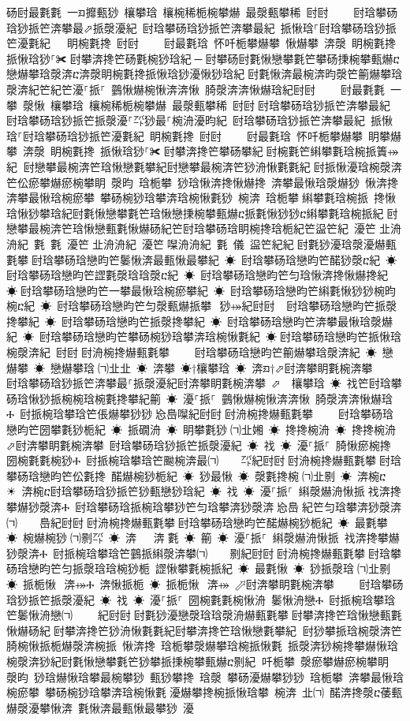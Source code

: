 ﻿\documentclass[output=paper]{langsci/langscibook}
\begin{document}
\begin{exe}
{\begin{exe}
砀尀最氀氀 一ᤀ攠甀猀 欀攀琀 欀椀稀栀椀攀爀 最漀甀攀稀 尀尀਀    尀琀攀砀琀猀挀笀渀攀最⬀挀漀瀀紀 尀琀攀砀琀猀挀笀渀攀最紀 挀愀琀⸀尀琀攀砀琀猀挀笀瀀氀紀   眀椀氀搀 尀尀਀    尀最氀琀 怀吀栀攀爀攀 愀爀攀 渀漀 眀椀氀搀 挀愀琀猀⸀✀਀尀攀渀搀笀砀氀椀猀琀紀਀─਀尀攀砀尀氀愀戀攀氀笀攀砀㨀椀攀甀爀ⴀ戀爀攀琀漀渀ⴀ渀漀眀椀氀搀挀愀琀猀瀀愀猀琀紀਀尀氀愀渀最椀渀昀漀笀䈀爀攀琀漀渀紀笀紀笀瀀⸀挀⸀ 䴀愀爀椀愀渀渀愀 䐀漀渀渀愀爀琀紀尀尀਀    尀最氀氀 一攀 漀愀 欀攀琀 欀椀稀栀椀攀爀 最漀甀攀稀 尀尀਀尀琀攀砀琀猀挀笀渀攀最紀 尀琀攀砀琀猀挀笀挀漀瀀⸀㌀猀最⸀椀洀瀀昀紀 尀琀攀砀琀猀挀笀渀攀最紀 挀愀琀⸀尀琀攀砀琀猀挀笀瀀氀紀 眀椀氀搀 尀尀਀    尀最氀琀 怀吀栀攀爀攀 眀攀爀攀 渀漀 眀椀氀搀 挀愀琀猀⸀✀਀尀攀渀搀笀攀砀攀紀਀尀椀氀笀䌀攀氀琀椀挀簀⤀紀਀਀尀戀攀最椀渀笀琀愀戀氀攀紀尀戀攀最椀渀笀猀洀愀氀氀紀਀尀挀愀瀀琀椀漀渀笀伀瘀攀爀瘀椀攀眀 漀昀 琀栀攀 猀琀愀渀搀愀爀搀 渀攀最愀琀漀爀猀 愀渀搀 渀攀最愀琀椀瘀攀 攀砀椀猀琀攀渀琀椀愀氀猀 椀渀 琀栀攀਀䌀攀氀琀椀挀 搀愀琀愀猀攀琀紀尀氀愀戀攀氀笀琀愀戀㨀椀攀甀爀ⴀ挀氀愀猀猀ⴀ䌀攀氀琀椀挀紀਀尀戀攀最椀渀笀琀愀戀甀氀愀爀砀紀笀尀琀攀砀琀眀椀搀琀栀紀笀䀀笀紀 瀀笀㄀㐀洀洀紀 氀 氀 瀀笀㄀㐀洀洀紀 瀀笀㄀㘀洀洀紀 氀 儀 䀀笀紀紀਀尀氀猀瀀琀漀瀀爀甀氀攀਀尀琀攀砀琀戀昀笀䰀愀渀最甀愀最攀紀 ☀ 尀琀攀砀琀戀昀笀䤀猀漀ⴀ紀 ☀ 尀琀攀砀琀戀昀笀䜀氀漀琀琀漀ⴀ紀 ☀ 尀琀攀砀琀戀昀笀匀琀愀渀搀愀爀搀紀 ☀਀尀琀攀砀琀戀昀笀一攀最愀琀椀瘀攀紀 ☀ 尀琀攀砀琀戀昀笀䌀氀愀猀猀椀昀椀ⴀ紀 ☀ 尀琀攀砀琀戀昀笀匀漀甀爀挀攀⠀猀⤀紀尀尀਀☀ 尀琀攀砀琀戀昀笀挀漀搀攀紀 ☀ 尀琀攀砀琀戀昀笀挀漀搀攀紀 ☀ 尀琀攀砀琀戀昀笀渀攀最愀琀漀爀紀 ☀ 尀琀攀砀琀戀昀笀攀砀椀猀琀攀渀琀椀愀氀紀 ☀਀尀琀攀砀琀戀昀笀挀愀琀椀漀渀紀 尀尀਀尀洀椀搀爀甀氀攀਀    尀琀攀砀琀戀昀笀䈀爀攀琀漀渀紀 ☀ 戀爀攀 ☀ 戀爀攀琀㄀㈀㐀㐀 ☀ 渀攀 ☀†欀攀琀 ☀ 渀ᤀ†⬀尀渀攀眀氀椀渀攀਀    尀琀攀砀琀猀挀笀渀攀最⸀挀漀瀀紀尀渀攀眀氀椀渀攀 ⬀  欀攀琀 ☀ 䄀笀尀琀攀砀琀愀猀挀椀椀琀椀氀搀攀紀䈀 ☀ 瀀⸀挀⸀ 䴀愀爀椀愀渀渀愀 䐀漀渀渀愀爀琀Ⰰ 尀挀椀琀攀琀笀倀爀攀猀猀㄀㤀㠀㘀紀尀尀਀尀洀椀搀爀甀氀攀਀    尀琀攀砀琀戀昀笀圀攀氀猀栀紀 ☀ 挀礀洀 ☀ 眀攀氀猀㄀㈀㐀㜀 ☀ 搀搀椀洀 ☀ 搀搀椀洀 ⬀尀渀攀眀氀椀渀攀 尀琀攀砀琀猀挀笀挀漀瀀紀 ☀ 䄀 ☀ 瀀⸀挀⸀ 䐀愀瘀椀搀 圀椀氀氀椀猀Ⰰ 尀挀椀琀攀琀笀䬀椀渀最㈀　　㌀紀尀尀਀尀洀椀搀爀甀氀攀਀尀琀攀砀琀戀昀笀伀氀搀 䤀爀椀猀栀紀 ☀ 猀最愀 ☀ 漀氀搀椀㄀㈀㐀㔀 ☀ 渀椀ⴀ ☀ 渀椀ⴀ尀琀攀砀琀猀挀笀猀甀戀猀琀紀 ☀ 䄀 ☀ 瀀⸀挀⸀ 䌀漀爀洀愀挀਀䄀渀搀攀爀猀漀渀Ⰰ 尀琀攀砀琀挀椀琀攀猀笀匀琀攀渀猀漀渀㄀㤀㠀㄀紀笀匀琀攀渀猀漀渀㈀　　㠀紀尀尀਀尀洀椀搀爀甀氀攀਀尀琀攀砀琀戀昀笀䤀爀椀猀栀紀 ☀ 最氀攀 ☀ 椀爀椀猀㄀㈀㔀㌀ ☀ 渀 ☀ 渀氀 ☀ 䈀 ☀ 瀀⸀挀⸀ 䌀漀爀洀愀挀 䄀渀搀攀爀猀漀渀Ⰰ 尀挀椀琀攀琀笀䴀挀䌀漀渀攀㈀　　㔀紀尀尀਀尀洀椀搀爀甀氀攀਀尀琀攀砀琀戀昀笀匀挀漀琀琀椀猀栀 䜀愀攀氀椀挀紀 ☀ 最氀愀 ☀ 猀挀漀琀㄀㈀㐀㔀 ☀ 挀栀愀⠀渀⤀Ⰰ 渀愀挀栀 ☀ 挀栀愀⠀渀⤀ ⬀尀渀攀眀氀椀渀攀਀    尀琀攀砀琀猀挀笀挀漀瀀紀 ☀ 䄀 ☀ 瀀⸀挀⸀ 圀椀氀氀椀愀洀 䰀愀洀戀Ⰰ 尀挀椀琀攀琀笀䰀愀洀戀㈀　　㄀紀尀尀਀尀氀猀瀀戀漀琀琀漀洀爀甀氀攀਀尀攀渀搀笀琀愀戀甀氀愀爀砀紀਀尀攀渀搀笀猀洀愀氀氀紀尀攀渀搀笀琀愀戀氀攀紀਀਀尀猀攀挀琀椀漀渀笀䐀椀愀挀栀爀漀渀椀挀 愀渀搀 琀栀攀漀爀攀琀椀挀愀氀 挀漀渀猀椀搀攀爀愀琀椀漀渀猀紀尀氀愀戀攀氀笀猀攀挀㨀椀攀甀爀ⴀ㔀紀਀਀吀栀攀 漀瘀攀爀瘀椀攀眀 漀昀 猀琀爀愀琀攀最椀攀猀 甀猀攀搀 琀漀 攀砀瀀爀攀猀猀 琀栀攀 渀攀最愀琀椀瘀攀 攀砀椀猀琀攀渀琀椀愀氀਀瀀爀攀搀椀挀愀琀攀 椀渀 㐀㈀ 䤀渀搀漀ⴀ䔀甀爀漀瀀攀愀渀 氀愀渀最甀愀最攀猀 瀀
\end{exe}}
\end{exe}
\end{document}
